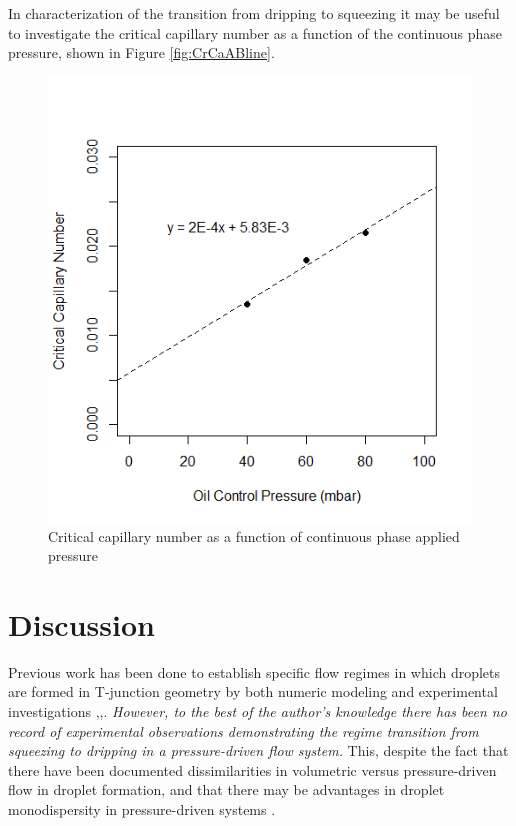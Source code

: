 \clearpage

In characterization of the transition from dripping to squeezing it may be useful to investigate the critical capillary number as a function of the continuous phase pressure, shown in Figure \vref{fig:CrCaABline}.

\begin{figure}[H]
\centering 
\includegraphics[width=0.75\columnwidth]{CrCaABline.PNG} 
\caption[Critical capillary number as a function of continuous phase applied pressure]{Critical capillary number as a function of continuous phase applied pressure} 
\label{fig:CrCaABline} 
\end{figure}


\clearpage

\section{Discussion}

Previous work has been done to establish specific flow regimes in which droplets are formed in T-junction geometry by both numeric modeling and experimental investigations \cite{Abate2012a},\cite{DeMenech2008},\cite{Garstecki2006}. \emph{However, to the best of the author's knowledge there has been no record of experimental observations demonstrating the regime transition from squeezing to dripping in a pressure-driven flow system.} This, despite the fact that there have been documented dissimilarities in volumetric versus pressure-driven flow in droplet formation\cite{Ward2005}, and that there may be advantages in droplet monodispersity in pressure-driven systems \cite{Christopher2008}\cite{Li2014a}. 

